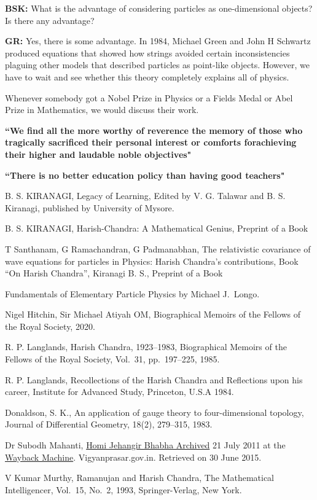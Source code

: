 \textbf{BSK:} What is the advantage of considering particles as one-\break dimensional objects? Is there any advantage?

\textbf{GR:} Yes, there is some advantage. In 1984, Michael Green and John H Schwartz produced equations that showed how strings avoided certain inconsistencies plaguing other models that described particles as point-like objects. However, we have to wait and see whether this theory completely explains all of physics.

Whenever somebody got a Nobel Prize in Physics or a Fields Medal or Abel Prize in Mathematics, we would discuss their work.

\textbf{``We find all the more worthy of reverence the memory of those who tragically sacrificed their personal interest or comforts for\break achieving their higher and laudable noble objectives"}

\textbf{``There is no better education policy than having good teachers"}

\begin{thebibliography}{99}
\itemsep=0pt
 B. S. KIRANAGI, Legacy of Learning, Edited by V. G. Talawar and B. S. Kiranagi, published by University of Mysore.

 B. S. KIRANAGI, Harish-Chandra: A Mathematical Genius, Preprint of a Book 

 T Santhanam, G Ramachandran, G Padmanabhan, The relativistic covariance of wave equations for particles in Physics: Harish Chandra's contributions, Book ``On Harish Chandra”, Kiranagi B. S., Preprint of a Book

 Fundamentals of Elementary Particle Physics by Michael J.\ Longo.

 Nigel Hitchin, Sir Michael Atiyah OM, Biographical Memoirs of the Fellows of the Royal Society, 2020.

 R. P. Langlands, Harish Chandra, 1923--1983, Biographical Memoirs of the Fellows of the Royal Society, Vol.\ 31, pp.\ 197--225, 1985.

 R. P. Langlands, Recollections of the Harish Chandra and Reflections upon his career, Institute for Advanced Study, Princeton, U.S.A 1984.

 Donaldson, S. K., An application of gauge theory to four-dimensional topology, Journal of Differential Geometry, 18(2), 279--315, 1983.

 Dr Subodh Mahanti,  \underline{Homi Jehangir Bhabha Archived} 21 July 2011 at the \underline{Wayback Machine}. Vigyanprasar.gov.in. Retrieved on 30 June 2015.

 V Kumar Murthy, Ramanujan and Harish Chandra, The Mathematical Intelligencer, Vol.\ 15, No.\ 2, 1993, Springer-Verlag, New York.

\end{thebibliography}
\vskip 1cm


